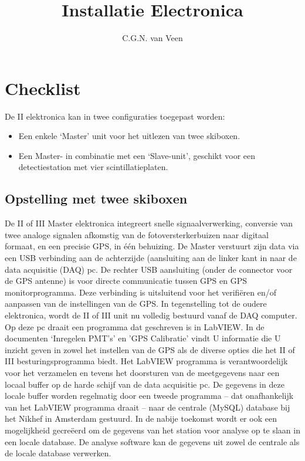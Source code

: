 

\title{Installatie \hisparc Electronica}
\author{C.G.N. van Veen}



\maketitle

\section{Checklist}

De \hisparc II elektronica kan in twee configuraties toegepast worden:
\begin{itemize}
    \item Een enkele ‘Master’ unit voor het uitlezen van twee skiboxen.
    \item Een Master- in combinatie met een ‘Slave-unit’, geschikt voor
    een detectiestation met vier scintillatieplaten.
\end{itemize}

\subsection{Opstelling met twee skiboxen}

De \hisparc II of III Master elektronica 
integreert snelle signaalverwerking, conversie van twee analoge signalen afkomstig van de
fotoversterkerbuizen naar digitaal formaat, en een precisie GPS, in één
behuizing. De Master verstuurt zijn data via een USB verbinding aan de
achterzijde (aansluiting aan de linker kant in 
naar de data acquisitie (DAQ) pc. De rechter USB aansluiting (onder de
connector voor de GPS antenne) is voor directe communicatie tussen GPS
en GPS monitorprogramma. Deze verbinding is uitsluitend voor het
verifiëren en/of aanpassen van de instellingen van de GPS. In
tegenstelling tot de oudere elektronica, wordt de \hisparc II of III unit
nu volledig bestuurd vanaf de DAQ computer. Op deze pc draait een
programma dat geschreven is in LabVIEW. In de documenten `Inregelen
PMT's' en 'GPS Calibratie'  vindt U informatie die U inzicht geven in
zowel het instellen van de GPS als de diverse opties die het \hisparc
II of III besturingsprogramma biedt. Het LabVIEW programma is
verantwoordelijk voor het verzamelen en tevens het doorsturen van de
meetgegevens naar een locaal buffer op de harde schijf van de data
acquisitie pc. De gegevens in deze locale buffer worden regelmatig door
een tweede programma – dat onafhankelijk van het LabVIEW programma
draait – naar de centrale (MySQL) database bij het Nikhef in Amsterdam
gestuurd. In de nabije toekomst wordt er ook een mogelijkheid gecreëerd
om de gegevens van het station voor analyse op te slaan in een locale
database. De analyse software kan de gegevens uit zowel de centrale als
de locale database verwerken.

